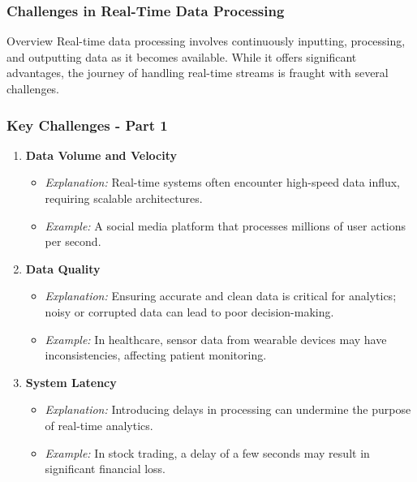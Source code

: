 \documentclass[aspectratio=169]{beamer}
\begin{document}
\begin{frame}[fragile]
    \frametitle{Challenges in Real-Time Data Processing}
    \begin{block}{Overview}
        Real-time data processing involves continuously inputting, processing, and outputting data as it becomes available. While it offers significant advantages, the journey of handling real-time streams is fraught with several challenges.
    \end{block}
\end{frame}

\begin{frame}[fragile]
    \frametitle{Key Challenges - Part 1}
    \begin{enumerate}
        \item \textbf{Data Volume and Velocity}
        \begin{itemize}
            \item \textit{Explanation:} Real-time systems often encounter high-speed data influx, requiring scalable architectures.
            \item \textit{Example:} A social media platform that processes millions of user actions per second.
        \end{itemize}

        \item \textbf{Data Quality}
        \begin{itemize}
            \item \textit{Explanation:} Ensuring accurate and clean data is critical for analytics; noisy or corrupted data can lead to poor decision-making.
            \item \textit{Example:} In healthcare, sensor data from wearable devices may have inconsistencies, affecting patient monitoring.
        \end{itemize}

        \item \textbf{System Latency}
        \begin{itemize}
            \item \textit{Explanation:} Introducing delays in processing can undermine the purpose of real-time analytics.
            \item \textit{Example:} In stock trading, a delay of a few seconds may result in significant financial loss.
        \end{itemize}
    \end{enumerate}
\end{frame}
\end{document}
